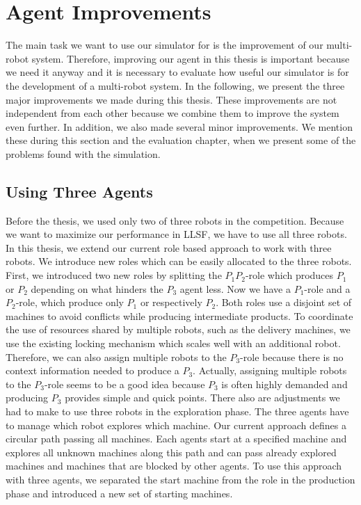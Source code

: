 \section{Agent Improvements}
\label{sec:agent_improvements}
The main task we want to use our simulator for is the improvement of our multi-robot system. Therefore, improving our agent in this thesis is important because we need it anyway and it is necessary to evaluate how useful our simulator is for the development of a multi-robot system. In the following, we present the three major improvements we made during this thesis. These improvements are not independent from each other because we combine them to improve the system even further. In addition, we also made several minor improvements. We mention these during this section and the evaluation chapter, when we present some of the problems found with the simulation.


\subsection{Using Three Agents}
Before the thesis, we used only two of three robots in the competition. Because we want to maximize our performance in LLSF, we have to use all three robots. In this thesis, we extend our current role based approach to work with three robots. We introduce new roles which can be easily allocated to the three robots.\\
First, we introduced two new roles by splitting the $P_1P_2$-role which produces $P_1$ or $P_2$ depending on what hinders the $P_3$ agent less. Now we have a $P_1$-role and a $P_2$-role, which produce only $P_1$ or respectively $P_2$. Both roles use a disjoint set of machines to avoid conflicts while producing intermediate products. To coordinate the use of resources shared by multiple robots, such as the delivery machines, we use the existing locking mechanism which scales well with an additional robot. Therefore, we can also assign multiple robots to the $P_3$-role because there is no context information needed to produce a $P_3$. Actually, assigning multiple robots to the $P_3$-role seems to be a good idea because $P_3$ is often highly demanded and producing $P_3$ provides simple and quick points. There also are adjustments we had to make to use three robots in the exploration phase. The three agents have to manage which robot explores which machine. Our current approach defines a circular path passing all machines. Each agents start at a specified machine and explores all unknown machines along this path and can pass already explored machines and machines that are blocked by other agents. To use this approach with three agents, we separated the start machine from the role in the production phase and introduced a new set of starting machines.

